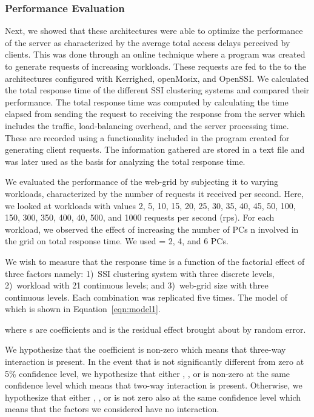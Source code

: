 \documentclass[preprint]{acm_proc_article-sp}
\begin{document}
\subsubsection{Performance Evaluation}
Next, we showed that these architectures were able to optimize the performance of the server as characterized by the average total access delays perceived by clients. This was done through an online technique where a program was created to generate requests of increasing workloads. These requests are fed to the to the architectures configured with Kerrighed, openMosix, and OpenSSI. We calculated the total response time of the different SSI clustering systems and compared their performance. The total response time was computed by calculating the time elapsed from sending the request to receiving the response from the server which includes the traffic, load-balancing overhead, and the server processing time. These are recorded using a functionality included in the program created for generating client requests. The information gathered are stored in a text file and was later used as the basis for analyzing the total response time.

We evaluated the performance of the web-grid by subjecting it to varying workloads, characterized by the number of requests it received per second. Here, we looked at workloads with values 2, 5, 10, 15, 20, 25, 30, 35, 40, 45, 50, 100, 150, 300, 350, 400, 40, 500, and 1000 requests per second (rps). For each workload, we observed the effect of increasing the number of PCs n involved in the grid on total response time. We used  = 2, 4, and 6 PCs.

We wish to measure that the response time  is a function of the factorial effect of three factors namely: 1)~SSI clustering system  with three discrete levels, 2)~workload  with 21 continuous levels; and 3)~web-grid size  with three continuous levels. Each  combination was replicated five times. The model of which is shown in Equation~\ref{eqn:model1}.



where s are coefficients and  is the residual effect brought about by random error.

We hypothesize that the coefficient  is non-zero which means that three-way interaction is present. In the event that  is not significantly different from zero at 5\% confidence level, we hypothesize that either , , or  is non-zero at the same confidence level which means that two-way interaction is present. Otherwise, we hypothesize that either , , or  is not zero also at the same confidence level which means that the factors we considered have no interaction.
\end{document}
